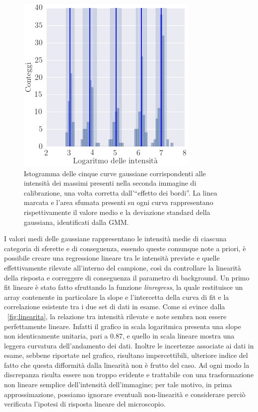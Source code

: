 \begin{figure}
 \centering
 \includegraphics[scale=.60]{img/CAP3istogauss.png}
 \caption{\small{Istogramma delle cinque curve gaussiane corrispondenti alle intensità dei massimi presenti nella seconda immagine di calibrazione, una volta corretta dall'``effetto dei bordi''. La linea marcata e l'area sfumata presenti su ogni curva rappresentano rispettivamente il valore medio e la deviazione standard della gaussiana, identificati dalla GMM.}}
 \label{fig:istogauss}
\end{figure}

I valori medi delle gaussiane rappresentano le intensità medie di ciascuna categoria di sferette e di conseguenza, essendo queste comunque note a priori, è possibile creare una regressione lineare tra le intensità previste e quelle effettivamente rilevate all'interno del campione, così da controllare la linearità della risposta e correggere di conseguenza il parametro di background. 
Un primo fit lineare è stato fatto sfruttando la funzione \textit{linregress}, la quale restituisce un array contenente in particolare la slope e l'intercetta della curva di fit e la correlazione esistente tra i due set di dati in esame.
Come si evince dalla \figurename~\ref{fig:linearita}, la relazione tra intensità rilevate e note sembra non essere perfettamente lineare. Infatti il grafico in scala logaritmica presenta una slope non identicamente unitaria, pari a 0.87, e quello in scala lineare mostra una leggera curvatura dell'andamento dei dati. 
Inoltre le incertezze associate ai dati in esame, sebbene riportate nel grafico, risultano impercettibili, ulteriore indice del fatto che questa  difformità dalla linearità non è frutto del caso.
Ad ogni modo la discrepanza risulta essere non troppo evidente e trattabile con una trasformazione non lineare semplice dell'intensità dell'immagine; per tale motivo, in prima approssimazione, possiamo ignorare eventuali non-linearità e considerare perciò verificata l'ipotesi di risposta lineare del microscopio. 

